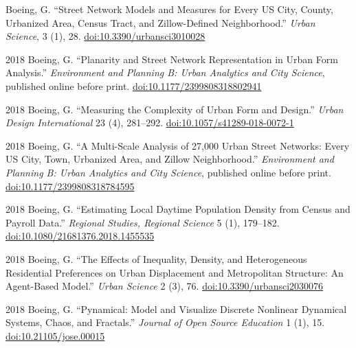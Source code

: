 \documentclass[12pt,letterpaper]{report}
\begin{document}
	\begin{tablist}

		\item[\the\year] \tab Boeing, G. \enquote{Street Network Models and Measures for Every US City, County, Urbanized Area, Census Tract, and Zillow-Defined Neighborhood.} \textit{Urban Science}, 3 (1), 28. \href{https://doi.org/10.3390/urbansci3010028 }{doi:10.3390/urbansci3010028 }

		\item[2018] \tab Boeing, G. \enquote{Planarity and Street Network Representation in Urban Form Analysis.} \textit{Environment and Planning B: Urban Analytics and City Science}, published online before print. \href{https://doi.org/10.1177/2399808318802941}{doi:10.1177/2399808318802941}

		\item[2018] \tab Boeing, G. \enquote{Measuring the Complexity of Urban Form and Design.} \textit{Urban Design International} 23 (4), 281--292. \href{https://doi.org/10.1057/s41289-018-0072-1}{doi:10.1057/s41289-018-0072-1}

		\item[2018] \tab Boeing, G. \enquote{A Multi-Scale Analysis of 27,000 Urban Street Networks: Every US City, Town, Urbanized Area, and Zillow Neighborhood.} \textit{Environment and Planning B: Urban Analytics and City Science}, published online before print. \href{https://doi.org/10.1177/2399808318784595}{doi:10.1177/2399808318784595}

		\item[2018] \tab Boeing, G. \enquote{Estimating Local Daytime Population Density from Census and Payroll Data.} \textit{Regional Studies, Regional Science} 5 (1), 179--182. \href{https://doi.org/10.1080/21681376.2018.1455535}{doi:10.1080/21681376.2018.1455535}

		\item[2018] \tab Boeing, G. \enquote{The Effects of Inequality, Density, and Heterogeneous Residential Preferences on Urban Displacement and Metropolitan Structure: An Agent-Based Model.} \textit{Urban Science} 2 (3), 76. \href{https://doi.org/10.3390/urbansci2030076}{doi:10.3390/urbansci2030076}

		\item[2018] \tab Boeing, G. \enquote{Pynamical: Model and Visualize Discrete Nonlinear Dynamical Systems, Chaos, and Fractals.} \textit{Journal of Open Source Education} 1 (1), 15. \href{https://doi.org/10.21105/jose.00015}{doi:10.21105/jose.00015}


\end{tablist}
\end{document}
